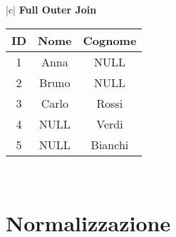 \documentclass[10pt]{article}
\begin{document}
\begin{table}[h]
    \centering
    \small %
    \setlength{\arrayrulewidth}{0.5mm} %
    \renewcommand{\arraystretch}{1.2} %
    \begin{tabular}{|c|}
    \hline
    \textbf{Full Outer Join} \\
    \hline
    \begin{tabular}{|c|c|c|}
    \hline
    \textbf{ID} & \textbf{Nome} & \textbf{Cognome} \\
    \hline
    1  & Anna  & NULL     \\
    \hline
    2  & Bruno & NULL     \\
    \hline
    3  & Carlo & Rossi    \\
    \hline
    4  & NULL  & Verdi    \\
    \hline
    5  & NULL  & Bianchi  \\
    \hline
    \end{tabular} \\
    \hline
    \end{tabular}
\end{table}    

\section{Normalizzazione}
\end{document}
